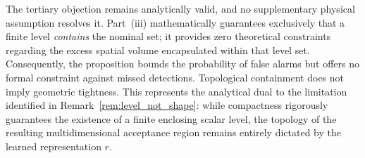 \documentclass[a4paper]{cas-sc}
\newcommand{\residual}{\ensuremath{r}}
\begin{document}
The tertiary objection remains analytically valid, and no supplementary physical assumption resolves it. Part~(iii) mathematically guarantees exclusively that a finite level \emph{contains} the nominal set; it provides zero theoretical constraints regarding the excess spatial volume encapsulated within that level set. Consequently, the proposition bounds the probability of false alarms but offers no formal constraint against missed detections. Topological containment does not imply geometric tightness. This represents the analytical dual to the limitation identified in Remark~\ref{rem:level_not_shape}: while compactness rigorously guarantees the existence of a finite enclosing scalar level, the topology of the resulting multidimensional acceptance region remains entirely dictated by the learned representation \(\residual\).
\end{document}
